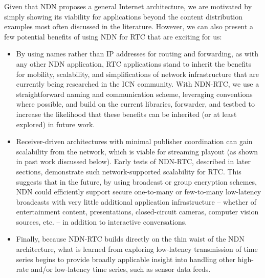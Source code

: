 \documentclass{icn/sig-alternate-2013} %
\newcommand{\ndnrtcName}{NDN-RTC} %
\begin{document}
Given that NDN proposes a general Internet architecture, we are motivated by simply showing its viability for applications beyond the content distribution examples most often discussed in the literature.  However, we can also present a few potential benefits of using NDN for RTC that are exciting for us: 
\begin{itemize}
\item By using names rather than IP addresses for routing and forwarding, as with any other NDN application, RTC applications stand to inherit the benefits for mobility, scalability, and simplifications of network infrastructure that are currently being researched in the ICN community. With \ndnrtcName{}, we use a straightforward naming and communication scheme, leveraging conventions where possible, and build on the current libraries, forwarder, and testbed to increase the likelihood that these benefits can be inherited (or at least explored) in future work. 
\item Receiver-driven architectures with minimal publisher coordination can gain scalability from the network, which is viable for streaming playout (as shown in past work discussed below). Early tests of \ndnrtcName{}, described in later sections, demonstrate such network-supported scalability for RTC. This suggests that in the future, by using broadcast or group encryption schemes, NDN could efficiently support secure one-to-many or few-to-many low-latency broadcasts with very little additional application infrastructure -- whether of entertainment content, presentations, closed-circuit cameras, computer vision sources, etc. -- in addition to interactive conversations. 
\item Finally, because \ndnrtcName{} builds directly on the thin waist of the NDN architecture, what is learned from exploring low-latency transmission of time series begins to provide broadly applicable insight into handling other high-rate and/or low-latency time series, such as sensor data feeds.  
\end{itemize}
\end{document}
